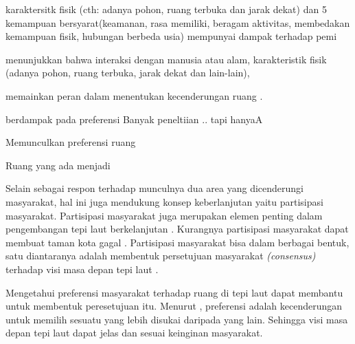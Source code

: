 \documentclass[../projects/thesis.tex]{subfiles}
\begin{document}
karaktersitk fisik (cth: adanya pohon, ruang terbuka dan jarak dekat) dan 5 kemampuan bersyarat(keamanan, rasa memiliki, beragam aktivitas, membedakan kemampuan fisik, hubungan berbeda usia) mempunyai dampak terhadap pemi

menunjukkan bahwa interaksi dengan manusia atau alam, karakteristik fisik (adanya pohon, ruang terbuka, jarak dekat dan lain-lain),

memainkan peran dalam menentukan kecenderungan ruang \citep{wen2018,arnberger2015}.


berdampak pada preferensi
Banyak peneltiian .. tapi hanyaA




Memunculkan preferensi ruang

Ruang yang ada menjadi



Selain sebagai respon terhadap munculnya dua area yang dicenderungi masyarakat, hal ini juga mendukung konsep keberlanjutan yaitu partisipasi masyarakat.
Partisipasi masyarakat juga merupakan elemen penting dalam pengembangan tepi laut berkelanjutan \citep{eldeeb2015,giovinazzi2009}. Kurangnya partisipasi masyarakat dapat membuat taman kota gagal \citep{devysandra2012}. Partisipasi masyarakat bisa dalam berbagai bentuk, satu diantaranya adalah membentuk persetujuan masyarakat \textit{(consensus)} terhadap visi masa depan tepi laut \citep{nysds2009}.


Mengetahui preferensi masyarakat terhadap ruang di tepi laut dapat membantu untuk membentuk peresetujuan itu. Menurut \cite{devysandra2012}, preferensi adalah kecenderungan untuk memilih sesuatu yang lebih disukai daripada yang lain. Sehingga visi masa depan tepi laut dapat jelas dan sesuai keinginan masyarakat.
\end{document}
